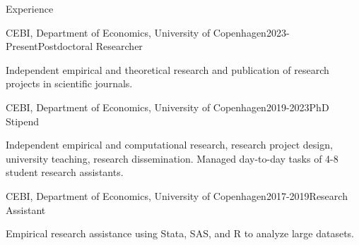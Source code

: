 \documentclass[
	11pt, %
]{resume} %
\begin{document}
\begin{rSection}{Experience}
    \begin{rSubsection}{CEBI, Department of Economics, University of Copenhagen}{2023-Present}{Postdoctoral Researcher}{}
        \item[] Independent empirical and theoretical research and publication of research projects in scientific journals.
    \end{rSubsection}

    \begin{rSubsection}{CEBI, Department of Economics, University of Copenhagen}{2019-2023}{PhD Stipend}{}
        \item[] Independent empirical and computational research, research project design, university teaching, research dissemination. Managed day-to-day tasks of 4-8 student research assistants.
    \end{rSubsection}

    \begin{rSubsection}{CEBI, Department of Economics, University of Copenhagen}{2017-2019}{Research Assistant}{}
        \item[] Empirical research assistance using Stata, SAS, and R to analyze large datasets.
    \end{rSubsection}


\end{rSection}
\end{document}
